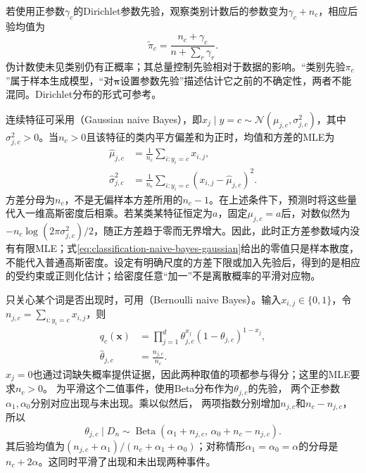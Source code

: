 若使用正参数$\gamma_c$的Dirichlet参数先验，观察类别计数后的参数变为$\gamma_c+n_c$，相应后验均值为
\[
  \tilde\pi_c=\frac{n_c+\gamma_c}{n+\sum_r\gamma_r}.
\]
伪计数使未见类别仍有正概率；其总量控制先验相对于数据的影响。“类别先验$\pi_c$”属于样本生成模型，“对$\bm\pi$设置参数先验”描述估计它之前的不确定性，两者不能混同。Dirichlet分布的形式可参考。

连续特征可采用（Gaussian naive Bayes），即$x_j\mid y=c\sim\mathcal{N}(\mu_{j,c},\sigma_{j,c}^{2})$，其中$\sigma_{j,c}^{2}>0$。当$n_c>0$且该特征的类内平方偏差和为正时，均值和方差的MLE为
\begin{equation}
  \label{eq:classification-naive-bayes-gaussian}
  \begin{aligned}
    \hat\mu_{j,c}
      &=\frac{1}{n_c}\sum_{i:y_i=c}x_{i,j},\\
    \hat\sigma_{j,c}^{2}
      &=\frac{1}{n_c}\sum_{i:y_i=c}
        (x_{i,j}-\hat\mu_{j,c})^2.
  \end{aligned}
\end{equation}
方差分母为$n_c$，不是无偏样本方差所用的$n_c-1$。在上述条件下，预测时将这些量代入一维高斯密度后相乘。若某类某特征恒定为$a$，固定$\mu_{j,c}=a$后，对数似然为$-n_c\log(2\pi\sigma_{j,c}^{2})/2$，随正方差趋于零而无界增大。因此，此时正方差参数域内没有有限MLE；式\eqref{eq:classification-naive-bayes-gaussian}给出的零值只是样本散度，不能代入普通高斯密度。设定有明确尺度的方差下限或加入先验后，得到的是相应的受约束或正则化估计；给密度任意“加一”不是离散概率的平滑对应物。

只关心某个词是否出现时，可用（Bernoulli naive Bayes）。输入$x_{i,j}\in\{0,1\}$，令$n_{j,c}=\sum_{i:y_i=c}x_{i,j}$，则
\begin{equation}
  \label{eq:classification-naive-bayes-bernoulli}
  \begin{aligned}
    q_c(\bm{x})
      &=\prod_{j=1}^{d}
        \theta_{j,c}^{x_j}(1-\theta_{j,c})^{1-x_j},\\
    \hat\theta_{j,c}&=\frac{n_{j,c}}{n_c}.
  \end{aligned}
\end{equation}
$x_j=0$也通过词缺失概率提供证据，因此两种取值的项都参与得分；这里的MLE要求$n_c>0$。
为平滑这个二值事件，使用Beta分布作为$\theta_{j,c}$的先验，
两个正参数$\alpha_1,\alpha_0$分别对应出现与未出现。乘以似然后，
两项指数分别增加$n_{j,c}$和$n_c-n_{j,c}$，所以
\[
  \theta_{j,c}\mid D_n
  \sim\operatorname{Beta}
    (\alpha_1+n_{j,c},\,\alpha_0+n_c-n_{j,c}).
\]
其后验均值为$(n_{j,c}+\alpha_1)/(n_c+\alpha_1+\alpha_0)$；对称情形$\alpha_1=\alpha_0=\alpha$的分母是$n_c+2\alpha$。这同时平滑了出现和未出现两种事件。

